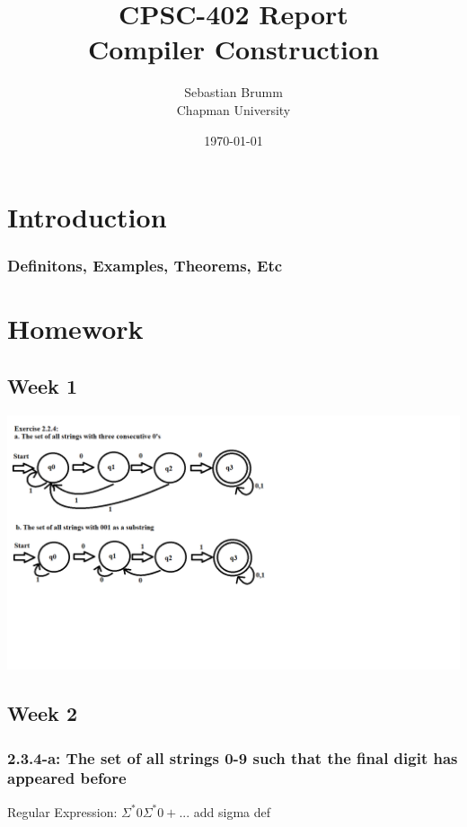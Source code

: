 \documentclass{article}
\title{CPSC-402 Report\\Compiler Construction}
\author{Sebastian Brumm  \\ Chapman University}
\date{\today}
\theoremstyle{theorem}
\theoremstyle{definition}
\theoremstyle{remark}
\begin{document}
\maketitle

\begin{abstract}
\end{abstract}

\tableofcontents

\section{Introduction}\label{intro}

\subsubsection{Definitons, Examples, Theorems, Etc}

\section{Homework}\label{homework}

\subsection{Week 1}

\includegraphics[scale=0.4]{Images/Homework1.png}

\subsection{Week 2}

\subsubsection{2.3.4-a: The set of all strings {0-9} such that the final digit has appeared before}
Regular Expression: $\Sigma^*0\Sigma^*0+...$ add sigma def
\end{document}

